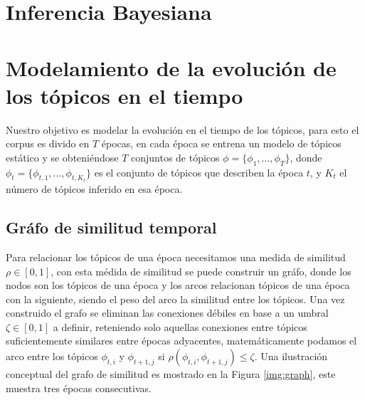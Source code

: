 \documentclass[letterpaper,12pt,oneside]{book} %
\begin{document}

\section{Inferencia Bayesiana}

\section{Modelamiento de la evolución de los tópicos en el tiempo}

Nuestro objetivo es modelar la evolución en el tiempo de los tópicos, para esto el corpus es divido en $T$ épocas, en cada época se entrena un modelo de tópicos estático y se obteniéndose $T$ conjuntos de tópicos $\phi=\{\phi_{1}, \ldots, \phi_{T}\}$, donde $\phi_{t}=\{\phi_{t,1}, \ldots, \phi_{t,K_{t}}\}$ es el conjunto de tópicos que describen la época $t$, y $K_{t}$ el número de tópicos inferido en esa época.

\subsection{Gráfo de similitud temporal}
Para relacionar los tópicos de una época necesitamos una medida de similitud $\rho \in [0,1]$, con esta médida de similitud se puede construir un gráfo, donde los nodos son los tópicos de una época y los arcos relacionan tópicos de una época con la siguiente, siendo el peso del arco la similitud entre los tópicos. Una vez construido el grafo se eliminan las conexiones débiles en base a un umbral $\zeta \in [0,1]$ a definir, reteniendo solo aquellas conexiones entre tópicos suficientemente similares entre épocas adyacentes, matemáticamente podamos el arco entre los tópicos $\phi_{t,i}$ y $\phi_{t+1,j}$ si $\rho(\phi_{t,i}, \phi_{t+1,j})\leq \zeta$. Una ilustración conceptual del grafo de similitud es mostrado en la Figura \ref{img:graph}, este muestra tres épocas consecutivas.
\end{document}
